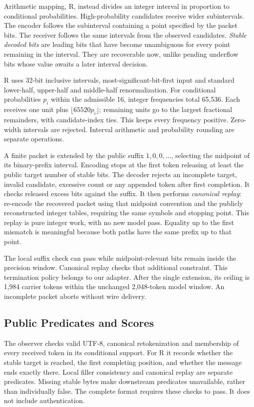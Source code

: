 \documentclass[a4paper,twoside]{article}
\begin{document}
Arithmetic mapping, R, instead divides an integer interval in proportion to conditional probabilities. High-probability candidates receive wider subintervals. The encoder follows the subinterval containing a point specified by the packet bits. The receiver follows the same intervals from the observed candidates. \emph{Stable decoded bits} are leading bits that have become unambiguous for every point remaining in the interval. They are recoverable now, unlike pending underflow bits whose value awaits a later interval decision.

R uses 32-bit inclusive intervals, most-significant-bit-first input and standard lower-half, upper-half and middle-half renormalization. For conditional probabilities $p_i$ within the admissible 16, integer frequencies total 65,536. Each receives one unit plus $\lfloor 65520p_i\rfloor$; remaining units go to the largest fractional remainders, with candidate-index ties. This keeps every frequency positive. Zero-width intervals are rejected. Interval arithmetic and probability rounding are separate operations.

A finite packet is extended by the public suffix $1,0,0,\ldots$, selecting the midpoint of its binary-prefix interval. Encoding stops at the first token releasing at least the public target number of stable bits. The decoder rejects an incomplete target, invalid candidate, excessive count or any appended token after first completion. It checks released excess bits against the suffix. It then performs \emph{canonical replay}: re-encode the recovered packet using that midpoint convention and the publicly reconstructed integer tables, requiring the same symbols and stopping point. This replay is pure integer work, with no new model pass. Equality up to the first mismatch is meaningful because both paths have the same prefix up to that point.

The local suffix check can pass while midpoint-relevant bits remain inside the precision window. Canonical replay checks that additional constraint. This termination policy belongs to our adapter. After the single extension, its ceiling is 1,984 carrier tokens within the unchanged 2,048-token model window. An incomplete packet aborts without wire delivery.

\subsection{Public Predicates and Scores}
\noindent The observer checks valid UTF-8, canonical retokenization and membership of every received token in its conditional support. For R it records whether the stable target is reached, the first completing position, and whether the message ends exactly there. Local filler consistency and canonical replay are separate predicates. Missing stable bytes make downstream predicates unavailable, rather than individually false. The complete format requires these checks to pass. It does not include authentication.
\end{document}

